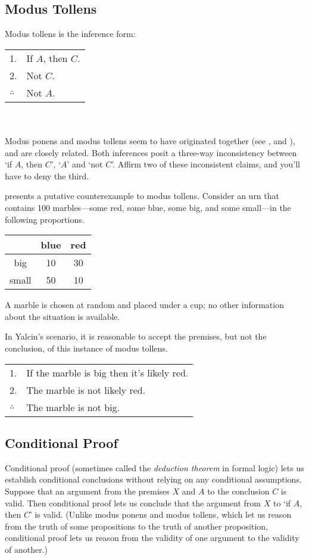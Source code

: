 \subsection{Modus Tollens}

Modus tollens is the inference form:\smallskip\\
\begin{tabular}{ll}
1. & If $A$, then $C$.\\
2. &Not $C$.\\
\hline
$\therefore$ & Not  $A$.
\end{tabular}\\\smallskip\\
Modus ponens and modus tollens seem to have originated together (see \citealp{Bobzien2002-BOBTDO-2}, and \citealp{sep-logic-india}), and are closely related.  Both inferences posit a three-way inconsistency between `if $A$, then $C$', `$A$' and `not $C$'.  Affirm two of these inconsistent claims, and you'll have to deny the third.

\citet{yalcin-tollens} presents a putative counterexample to modus tollens.  Consider an urn that contains 100 marbles---some red, some blue, some big, and some small---in the following proportions.
\begin{center}
\begin{tabular}{c|cc}
& blue & red\\
\hline
big & 10 & 30\\
small & 50 & 10
\end{tabular}
\end{center}
A marble is chosen at random and placed under a cup; no other information about the situation is available.

In Yalcin's scenario, it is reasonable to accept the premises, but not the conclusion, of this instance of modus tollens.\smallskip\\
\begin{tabular}{ll}
1. & If the marble is big then it's likely red.\\
2. & The marble is not likely red.\\
\hline
$\therefore$ & The marble is not big.
\end{tabular}

\subsection{Conditional Proof}

Conditional proof (sometimes called the \emph{deduction theorem} in formal logic) lets us establish conditional conclusions without relying on any conditional assumptions.  Suppose that an argument from the premises $X$ and $A$ to the conclusion $C$ is valid.  Then conditional proof lets us conclude that the argument from $X$ to `if $A$, then $C$' is valid.  (Unlike modus ponens and modus tollens, which let us reason from the truth of some propositions to the truth of another proposition, conditional proof lets us reason from the validity of one argument to the validity of another.)

